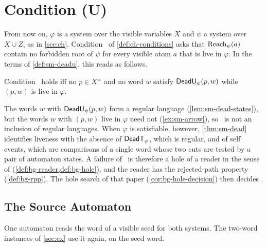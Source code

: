 
\section{Condition (U)}\label{sec:un}

From now on, $\varphi$ is a system over the visible variables $X$ and $\psi$ a
system over $X\cup Z$, as in \cref{sec:ch}. Condition \CondU\ of
\cref{def:ch-conditions} asks that $\operatorname{Reach}_\psi(a)$ contain no forbidden root of
$\psi$ for every visible atom $a$ that is live in $\varphi$. In the terms of
\cref{def:sm-deadu}, this reads as follows.

\begin{lemma}[Condition (U)]\label{lem:un-dead}
Condition \CondU\ holds iff no $p\in X^\pm$ and no word $w$ satisfy
$\mathsf{DeadU}_\psi(p,w)$ while $(p,w)$ is live in $\varphi$.
\end{lemma}

The words $w$ with $\mathsf{DeadU}_\psi(p,w)$ form a regular language
(\cref{lem:sm-dead-states}), but the words $w$ with $(p,w)$ live in $\varphi$
need not (\cref{ex:sm-arrow}), so \CondU\ is not an inclusion of regular
languages. When $\varphi$ is satisfiable, however, \cref{thm:sm-dead}
identifies liveness with the absence of $\mathsf{DeadT}_\varphi$, which is regular,
and of self events, which are comparisons of a single word whose two cuts are
tested by a pair of automaton states. A failure of \CondU\ is therefore a hole of a reader in the sense of
\citet{Zhao26} (\cref{def:bg-reader,def:bg-hole}), and the reader has the
rejected-path property (\cref{def:bg-rpp}). The hole search of that paper
(\cref{cor:bg-hole-decision}) then decides \CondU.

\subsection{The Source Automaton}\label{sec:un-automaton}

One automaton reads the word of a visible seed for both systems. The two-word
instances of \cref{sec:ex} use it again, on the seed word.

